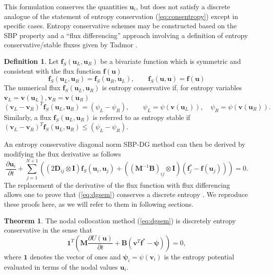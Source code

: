 \documentclass[preprint,10pt]{elsarticle}
\theoremstyle{definition}
\newtheorem{definition}{Definition}
\theoremstyle{lemma}
\theoremstyle{theorem}
\newtheorem{theorem}{Theorem}
\theoremstyle{assumption}
\newcommand{\pd}[2]{\frac{\partial#1}{\partial#2}}
\newcommand{\LRp}[1]{\left( #1 \right)}
\begin{document}
This formulation conserves the quantities $\bm{u}_i$, but does not satisfy a discrete analogue of the statement of entropy conservation (\ref{eq:consentropy}) except in specific cases.  Entropy conservative schemes may be constructed based on the SBP property and a ``flux differencing'' approach \cite{gassner2016split} involving a definition of entropy conservative/stable fluxes given by Tadmor \cite{tadmor1987numerical}.  
\begin{definition}
Let $\bm{f}_S(\bm{u}_L,\bm{u}_R)$ be a bivariate function which is symmetric and consistent with the flux function $\bm{f}(\bm{u})$
\[
\bm{f}_S(\bm{u}_L,\bm{u}_R) = \bm{f}_S(\bm{u}_R,\bm{u}_L), \qquad \bm{f}_S(\bm{u},\bm{u}) = \bm{f}(\bm{u})
\]
The numerical flux $\bm{f}_S(\bm{u}_L, \bm{u}_R)$ is entropy conservative if, for entropy variables $\bm{v}_L = \bm{v}(\bm{u}_L), \bm{v}_R = \bm{v}(\bm{u}_R)$
\[
\LRp{\bm{v}_L - \bm{v}_R}^T \bm{f}_S(\bm{u}_L,\bm{u}_R) = (\psi_L - \psi_R), \qquad \psi_L = \psi(\bm{v}(\bm{u}_L)), \quad \psi_R = \psi(\bm{v}(\bm{u}_R)).  
\]
Similarly, a flux $\bm{f}_S(\bm{u}_L, \bm{u}_R)$ is referred to as entropy stable if $\LRp{\bm{v}_L - \bm{v}_R}^T \bm{f}_S(\bm{u}_L,\bm{u}_R) \leq (\psi_L - \psi_R)$.
\label{def:tadmor}
\end{definition}
An entropy conservative diagonal norm SBP-DG method can then be derived by modifying the flux derivative as follows
\begin{equation}
\pd{\bm{u}_i}{t} + \sum_{j=1}^{N+1}\LRp{\LRp{2\bm{D}_{ij}\otimes \bm{I}}\bm{f}_S(\bm{u}_i,\bm{u}_j) +\LRp{\LRp{\bm{M}^{-1}\bm{B}}_{ij}\otimes \bm{I}}(\bm{f}_j^* - \bm{f}(\bm{u}_j))}= 0.
\label{eq:dgsem}
\end{equation}
The replacement of the derivative of the flux function with flux differencing allows one to prove that (\ref{eq:dgsem}) conserves a discrete entropy \cite{gassner2017br1,chen2017entropy}.  We reproduce these proofs here, as we will refer to them in following sections.  
\begin{theorem}
The nodal collocation method (\ref{eq:dgsem}) is discretely entropy conservative in the sense that
\[
\bm{1}^T\LRp{\bm{M}\pd{U(\bm{u})}{t} + \bm{B}\LRp{\bm{v}^T\bm{f}^* - \bm{\psi}}} = 0,
\]
where $\bm{1}$ denotes the vector of ones and $\bm{\psi}_i = \psi(\bm{v}_i)$ is the entropy potential evaluated in terms of the nodal values $\bm{u}_i$.  
\label{thm:dgsem}
\end{theorem}
\end{document}
